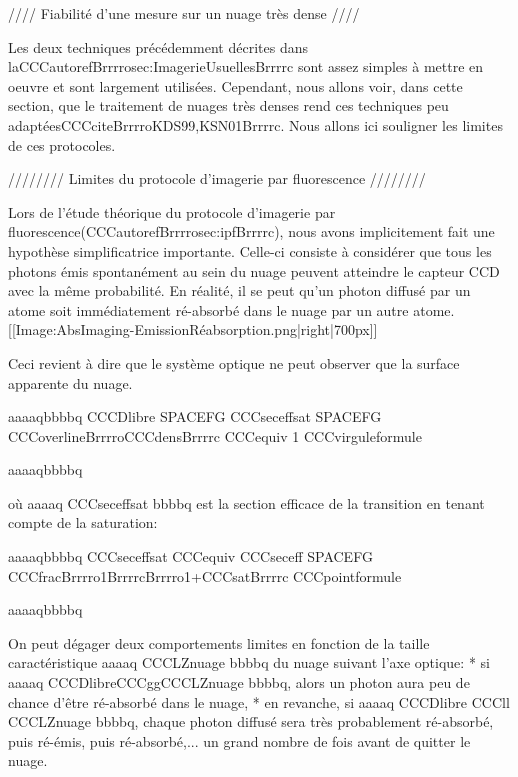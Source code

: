 //// Fiabilité d'une mesure sur un nuage très dense ////

Les deux techniques précédemment décrites dans laCCCautorefBrrrrosec:ImagerieUsuellesBrrrrc sont assez simples à mettre en oeuvre et sont largement utilisées. Cependant, nous allons voir, dans cette section, que le traitement de nuages très denses rend ces techniques peu adaptéesCCCciteBrrrroKDS99,KSN01Brrrrc. Nous allons ici souligner les limites de ces protocoles.


//////// Limites du protocole d'imagerie par fluorescence ////////

Lors de l'étude théorique du protocole d'imagerie par fluorescence(CCCautorefBrrrrosec:ipfBrrrrc), nous avons implicitement fait une hypothèse simplificatrice importante. Celle-ci consiste à considérer que tous les photons émis spontanément au sein du nuage peuvent atteindre le capteur CCD avec la même probabilité. 
En réalité, il se peut qu'un photon diffusé par un atome soit immédiatement ré-absorbé dans le nuage par un autre atome.
[[Image:AbsImaging-EmissionRéabsorption.png|right|700px]]

Ceci revient à dire que le système optique ne peut observer que la surface apparente du nuage.




aaaaqbbbbq
	CCCDlibre  SPACEFG  CCCseceffsat  SPACEFG  CCCoverlineBrrrroCCCdensBrrrrc CCCequiv 1
	CCCvirguleformule
	
aaaaqbbbbq



où aaaaq CCCseceffsat bbbbq est la section efficace de la transition en tenant compte de la saturation:



aaaaqbbbbq
	CCCseceffsat CCCequiv CCCseceff  SPACEFG  CCCfracBrrrro1BrrrrcBrrrro1+CCCsatBrrrrc
	CCCpointformule
	
aaaaqbbbbq



On peut dégager deux comportements limites en fonction de la taille caractéristique aaaaq CCCLZnuage bbbbq du nuage suivant l'axe optique: 
	* si aaaaq CCCDlibreCCCggCCCLZnuage bbbbq, alors un photon aura peu de chance d'être ré-absorbé dans le nuage, 
	* en revanche, si aaaaq CCCDlibre CCCll CCCLZnuage bbbbq, chaque photon diffusé sera très probablement ré-absorbé, puis ré-émis, puis ré-absorbé,... un grand nombre de fois avant de quitter le nuage.





